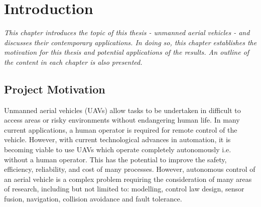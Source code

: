 
\chapter{Introduction}
\textit{This chapter introduces the topic of this thesis - unmanned aerial vehicles - and discusses their contemporary applications. In doing so, this chapter establishes the motivation for this thesis and potential applications of the results. An outline of the content in each chapter is also presented.}\\

\section{Project Motivation}
Unmanned aerial vehicles (UAVs) allow tasks to be undertaken in difficult to access areas or risky environments without endangering human life. In many current applications, a human operator is required for remote control of the vehicle. However, with current technological advances in automation, it is becoming viable to use UAVs which operate completely autonomously i.e. without a human operator. This has the potential to improve the safety, efficiency, reliability, and cost of many processes. However, autonomous control of an aerial vehicle is a complex problem requiring the consideration of many areas of research, including but not limited to: modelling, control law design, sensor fusion, navigation, collision avoidance and fault tolerance.\\

